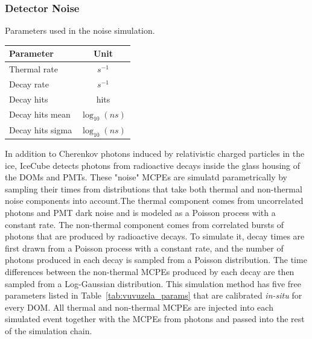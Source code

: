 \subsubsection{Detector Noise}

\begin{margintable}
\caption{\label{tab:vuvuzela_params} Parameters used in the noise simulation. }
    \begin{tabular}{lc}\toprule
        \textbf{Parameter} & \textbf{Unit} \\ \midrule
        Thermal rate &  $s^{-1}$ \\
        Decay rate &  $s^{-1}$ \\
        Decay hits &  hits \\
        Decay hits mean &  $\log_{10} (ns) $\\
        Decay hits sigma &  $\log_{10} (ns) $ \\ \bottomrule
    \end{tabular}
\end{margintable}
In addition to Cherenkov photons induced by relativistic charged particles in the ice, IceCube detects photons from radioactive decays inside the glass housing of the DOMs and PMTs.
These "noise" MCPEs are simulatd parametrically by sampling their times from distributions that take both thermal and non-thermal noise components into account.The thermal component comes from uncorrelated photons and PMT dark noise and is modeled as a Poisson process with a constant rate.
The non-thermal component comes from correlated bursts of photons that are produced by radioactive decays.
To simulate it, decay times are first drawn from a Poisson process with a constant rate, and the number of photons produced in each decay is sampled from a Poisson distribution.
The time differences between the non-thermal MCPEs produced by each decay are then sampled from a Log-Gaussian distribution.
This simulation method has five free parameters listed in Table~\ref{tab:vuvuzela_params} that are calibrated \emph{in-situ} for every DOM.
All thermal and non-thermal MCPEs are injected into each simulated event together with the MCPEs from photons and passed into the rest of the simulation chain.

